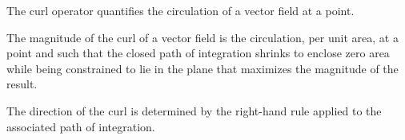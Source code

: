 \begin{mdframed}[backgroundcolor=yellow!20,nobreak=true] 
The curl operator quantifies the circulation of a vector field at a point.
\end{mdframed}

\begin{mdframed}[backgroundcolor=yellow!20,nobreak=true] 
The magnitude of the curl of a vector field is the circulation, per unit area, at a point and such that the closed path of integration shrinks to enclose zero area while being constrained to lie in the plane that maximizes the magnitude of the result.
\end{mdframed}

\begin{mdframed}[backgroundcolor=yellow!20,nobreak=true] 
The direction of the curl is determined by the right-hand rule applied to the associated path of integration.
\end{mdframed}

